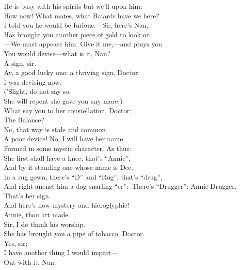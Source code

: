 \documentclass[a4paper,oneside,12pt]{memoir}
\begin{document}
\begin{drama*}
\facespeaks He is busy with his spirits but we'll upon him.\\
\subtlespeaks How now! What mates, what Baiards have we here?\\
\facespeaks I told you he would be furious.---Sir, here's Nan,\\
Has brought you another piece of gold to look on:\\
---We must appease him. Give it me,---and prays you\\
You would devise---what is it, Nan?\\
\druggerspeaks {} A sign, sir.\\
\facespeaks Ay, a good lucky one: a thriving sign, Doctor.\\
\subtlespeaks I was devising now.\\
\facespeaks {} ('Slight, do not say so,\\
She will repent she gave you any more.)\\
What say you to her constellation, Doctor:\\
The Balance?\\
\subtlespeaks {} No, that way is stale and common.\\
A poor device! No, I will have her name\\
Formed in some mystic character. As thus:\\
She first shall have a knee, that's ``Annie'',\\
And by it standing one whose name is Dee,\\
In a rug gown, there's ``D'' and ``Rug'', that's ``drug'',\\
And right anenst him a dog snarling ``er'':\
There's ``Drugger'': Annie Drugger. That's her sign.\\
And here's now mystery and hieroglyphic!\\
\facespeaks Annie, thou art made.\\
\druggerspeaks {} Sir, I do thank his worship.\\
\facespeaks She has brought you a pipe of tobacco, Doctor.\\
\druggerspeaks {} Yes, sir;\\
I have another thing I would impart---\\
\facespeaks Out with it, Nan.\\

\end{drama*}
\end{document}
